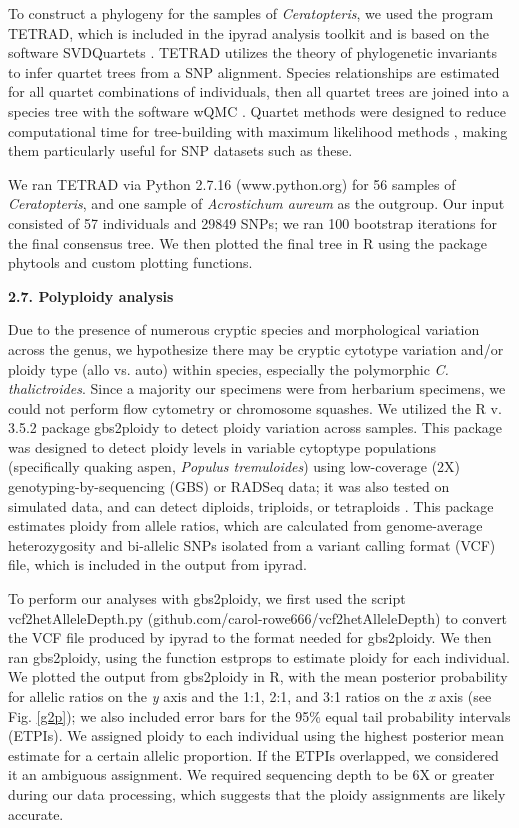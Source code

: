 \documentclass[12pt]{article}
\begin{document}
\begin{flushleft}
To construct a phylogeny for the samples of \textit{Ceratopteris}, we used the program {\small{TETRAD}}, which is included in the ipyrad analysis toolkit and is based on the software \small{SVDQuartets} \autocite{Chifman2015}. {\small{TETRAD}} utilizes the theory of phylogenetic invariants to infer quartet trees from a SNP alignment. Species relationships are estimated for all quartet combinations of individuals, then all quartet trees are joined into a species tree with the software {\small{wQMC}} \autocite{Avni2015}. Quartet methods were designed to reduce computational time for tree-building with maximum likelihood methods \autocite{Ranwez2001}, making them particularly useful for SNP datasets such as these.

We ran {\small{TETRAD}} via Python 2.7.16 (www.python.org) for 56 samples of \textit{Ceratopteris}, and one sample of \textit{Acrostichum aureum} as the outgroup. Our input consisted of 57 individuals and 29849 SNPs; we ran 100 bootstrap iterations for the final consensus tree. We then plotted the final tree in R using the package phytools \autocite{Revell2012} and custom plotting functions.

\textbf{2.7. Polyploidy analysis}

Due to the presence of numerous cryptic species and morphological variation across the genus, we hypothesize there may be cryptic cytotype variation and/or ploidy type (allo vs. auto) within species, especially the polymorphic \textit{C. thalictroides}. Since a majority our specimens were from herbarium specimens, we could not perform flow cytometry or chromosome squashes. We utilized the R v. 3.5.2 \autocite{R_352} package gbs2ploidy to detect ploidy variation across samples. This package was designed to detect ploidy levels in variable cytoptype populations (specifically quaking aspen, \textit{Populus tremuloides}) using low-coverage (2X) genotyping-by-sequencing (GBS) or RADSeq data; it was also tested on simulated data, and can detect diploids, triploids, or tetraploids \autocite{Gompert2017}. This package estimates ploidy from allele ratios, which are calculated from genome-average heterozygosity and bi-allelic SNPs isolated from a variant calling format (VCF) file, which is included in the output from ipyrad.

To perform our analyses with gbs2ploidy, we first used the script vcf2hetAlleleDepth.py (github.com/carol-rowe666/vcf2hetAlleleDepth) to convert the VCF file produced by ipyrad to the format needed for gbs2ploidy. We then ran gbs2ploidy, using the function estprops to estimate ploidy for each individual. We plotted the output from gbs2ploidy in R, with the mean posterior probability for allelic ratios on the \textit{y} axis and the 1:1, 2:1, and 3:1 ratios on the \textit{x} axis (see Fig. \ref{g2p}); we also included error bars for the 95\% equal tail probability intervals (ETPIs). We assigned ploidy to each individual using the  highest posterior mean estimate for a certain allelic proportion. If the ETPIs overlapped, we considered it an ambiguous assignment. We required sequencing depth to be 6X or greater during our data processing, which suggests that the ploidy assignments are likely accurate.


\end{flushleft}
\end{document}
